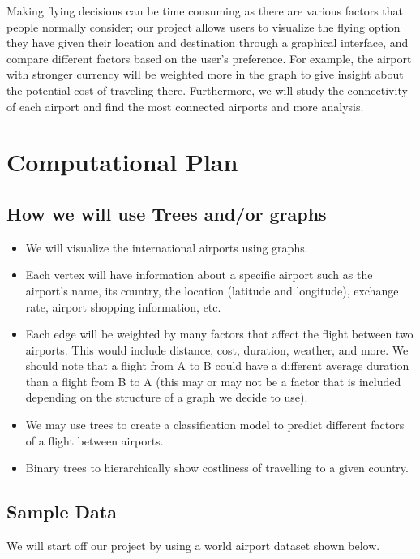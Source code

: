 \documentclass[fontsize=11pt]{article}
\begin{document}
    Making flying decisions can be time consuming as there are various factors that people normally consider; our project allows users to visualize the flying option they have given their location and destination through a graphical interface, and compare different factors based on the user's preference. For example, the airport with stronger currency will be weighted more in the graph to give insight about the potential cost of traveling there. Furthermore, we will study the connectivity of each airport and find the most connected airports and more analysis.
\endgroup

\section*{Computational Plan}

\subsection{How we will use Trees and/or graphs}
    
\begin{itemize}
    \item We will visualize the international airports using graphs.
    \item Each vertex will have information about a specific airport such as the airport's name, its country, the location (latitude and longitude), exchange rate, airport shopping information, etc.
    \item Each edge will be weighted by many factors that affect the flight between two airports. This would include distance, cost, duration, weather, and more. We should note that a flight from A to B could have a different average duration than a flight from B to A (this may or may not be a factor that is included depending on the structure of a graph we decide to use).
    \item We may use trees to create a classification model to predict different factors of a flight between airports.
    \item Binary trees to hierarchically show costliness of travelling to a given country.


\end{itemize}

    
\subsection{Sample Data}
        We will start off our project by using a world airport dataset shown below.
        
\end{document}
